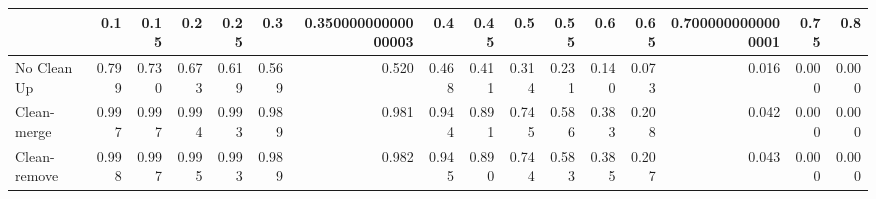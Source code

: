 \begin{tabular}{lrrrrrrrrrrrrrrr}
\toprule
{} &   0.1 &  0.15 &   0.2 &  0.25 &   0.3 & 0.35000000000000003 &   0.4 &  0.45 &   0.5 &  0.55 &   0.6 &  0.65 & 0.7000000000000001 &  0.75 &   0.8 \\
\midrule
No Clean Up  & 0.799 & 0.730 & 0.673 & 0.619 & 0.569 &               0.520 & 0.468 & 0.411 & 0.314 & 0.231 & 0.140 & 0.073 &              0.016 & 0.000 & 0.000 \\
Clean-merge  & 0.997 & 0.997 & 0.994 & 0.993 & 0.989 &               0.981 & 0.944 & 0.891 & 0.745 & 0.586 & 0.383 & 0.208 &              0.042 & 0.000 & 0.000 \\
Clean-remove & 0.998 & 0.997 & 0.995 & 0.993 & 0.989 &               0.982 & 0.945 & 0.890 & 0.744 & 0.583 & 0.385 & 0.207 &              0.043 & 0.000 & 0.000 \\
\bottomrule
\end{tabular}
